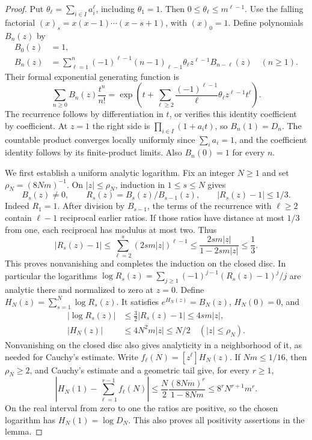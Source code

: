 \documentclass[11pt]{article}
\theoremstyle{definition}
\begin{document}
\begin{proof}
Put $\theta_\ell=\sum_{i\in I}a_i^\ell$, including $\theta_1=1$.
Then $0\le\theta_\ell\le m^{\ell-1}$.
Use the falling factorial
$(x)_s=x(x-1)\cdots(x-s+1)$, with $(x)_0=1$.
Define polynomials $B_n(z)$ by
\begin{equation}
 \begin{aligned}
 B_0(z)&=1,\\
 B_n(z)&=\sum_{\ell=1}^n(-1)^{\ell-1}
        (n-1)_{\ell-1}\theta_\ell z^{\ell-1}B_{n-\ell}(z)
                                      \quad(n\ge1).
 \end{aligned}
 \label{eq:collision-deformed-newton}
\end{equation}
Their formal exponential generating function is
\[
 \sum_{n\ge0}B_n(z)\frac{t^n}{n!}
  =\exp\left(t+
       \sum_{\ell\ge2}
          \frac{(-1)^{\ell-1}}{\ell}
                     \theta_\ell z^{\ell-1}t^\ell\right).
\]
The recurrence follows by differentiation in $t$, or verifies
this identity coefficient by coefficient.
At $z=1$ the right side is $\prod_{i\in I}(1+a_it)$,
so $B_n(1)=D_n$.
The countable product converges locally uniformly since
$\sum_i a_i=1$, and the coefficient identity follows by
its finite-product limits.
Also $B_n(0)=1$ for every $n$.

We first establish a uniform analytic logarithm.
Fix an integer $N\ge1$ and set $\rho_N=(8Nm)^{-1}$.
On $|z|\le\rho_N$, induction in $1\le s\le N$ gives
\begin{equation}
 B_s(z)\ne0,\qquad
 R_s(z)=B_s(z)/B_{s-1}(z),\qquad
 |R_s(z)-1|\le1/3 .
 \label{eq:collision-deformed-zero-free}
\end{equation}
Indeed $R_1=1$.
After division by $B_{s-1}$, the terms of the recurrence
with $\ell\ge2$ contain $\ell-1$ reciprocal earlier ratios.
If those ratios have distance at most $1/3$ from one,
each reciprocal has modulus at most two.
Thus
\[
 |R_s(z)-1|
   \le\sum_{\ell=2}^s(2sm|z|)^{\ell-1}
   \le\frac{2sm|z|}{1-2sm|z|}
   \le\frac13 .
\]
This proves nonvanishing and completes the induction on the
closed disc.  In particular the logarithms
$\log R_s(z)=\sum_{j\ge1}(-1)^{j-1}(R_s(z)-1)^j/j$
are analytic there and normalized to zero at $z=0$.
Define $H_N(z)=\sum_{s=1}^N\log R_s(z)$.
It satisfies $e^{H_N(z)}=B_N(z)$, $H_N(0)=0$, and
\[
 \begin{aligned}
 |\log R_s(z)|&\le\tfrac32|R_s(z)-1|\le4sm|z|,\\
 |H_N(z)|&\le4N^2m|z|\le N/2
                              \quad(|z|\le\rho_N).
 \end{aligned}
\]
Nonvanishing on the closed disc also gives analyticity in
a neighborhood of it, as needed for Cauchy's estimate.
Write $f_\ell(N)=[z^\ell]H_N(z)$.
If $Nm\le1/16$, then $\rho_N\ge2$, and Cauchy's estimate
and a geometric tail give, for every $r\ge1$,
\begin{equation}
 \left|H_N(1)-\sum_{\ell=1}^{r-1}f_\ell(N)\right|
       \le\frac N2\frac{(8Nm)^r}{1-8Nm}
       \le8^rN^{r+1}m^r.
 \label{eq:collision-uniform-taylor-tail}
\end{equation}
On the real interval from zero to one the ratios are positive,
so the chosen logarithm has $H_N(1)=\log D_N$.
This also proves all positivity assertions in the lemma.


\end{proof}
\end{document}
